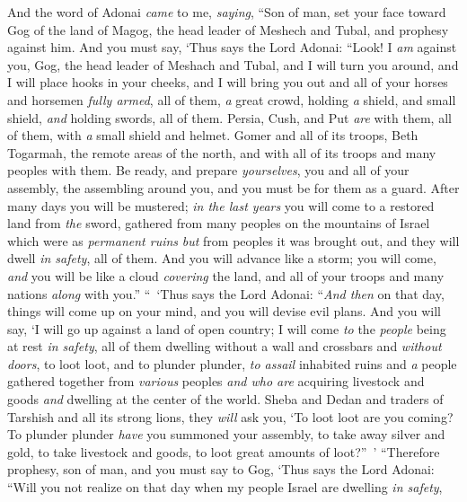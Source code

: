 \begin{biblechapter} %
 And the word of Adonai \textit{came} to me, \textit{saying},
\verse “Son of man, set your face toward Gog of the land of Magog, the head leader of Meshech and Tubal, and prophesy against him.
\verse And you must say, ‘Thus says the Lord Adonai: “Look! I \textit{am} against you, Gog, the head leader of Meshach and Tubal,
\verse and I will turn you around, and I will place hooks in your cheeks, and I will bring you out and all of your horses and horsemen \textit{fully armed}, all of them, \textit{a} great crowd, holding \textit{a} shield, and small shield, \textit{and} holding swords, all of them.
\verse Persia, Cush, and Put \textit{are} with them, all of them, with \textit{a} small shield and helmet.
\verse Gomer and all of its troops, Beth Togarmah, the remote areas of the north, and with all of its troops and many peoples with them.
\verse Be ready, and prepare \textit{yourselves}, you and all of your assembly, the assembling around you, and you must be for them as a guard.
\verse After many days you will be mustered; \textit{in the last years} you will come to a restored land from \textit{the} sword, gathered from many peoples on the mountains of Israel which were as \textit{permanent ruins} \textit{but} from peoples it was brought out, and they will dwell \textit{in safety}, all of them.
\verse And you will advance like a storm; you will come, \textit{and} you will be like a cloud \textit{covering} the land, and all of your troops and many nations \textit{along} with you.”
\verse “ ‘Thus says the Lord Adonai: “\textit{And then} on that day, things will come up on your mind, and you will devise evil plans.
\verse And you will say, ‘I will go up against a land of open country; I will come \textit{to} the \textit{people} being at rest \textit{in safety}, all of them dwelling without a wall and crossbars and \textit{without doors},
\verse to loot loot, and to plunder plunder, \textit{to assail} inhabited ruins and \textit{a} people gathered together from \textit{various} peoples \textit{and who are} acquiring livestock and goods \textit{and} dwelling at the center of the world.
\verse Sheba and Dedan and traders of Tarshish and all its strong lions, they \textit{will} ask you, ‘To loot loot are you coming? To plunder plunder \textit{have} you summoned your assembly, to take away silver and gold, to take livestock and goods, to loot great amounts of loot?” ’
\verse “Therefore prophesy, son of man, and you must say to Gog, ‘Thus says the Lord Adonai: “Will you not realize on that day when my people Israel are dwelling \textit{in safety},

\end{biblechapter}

